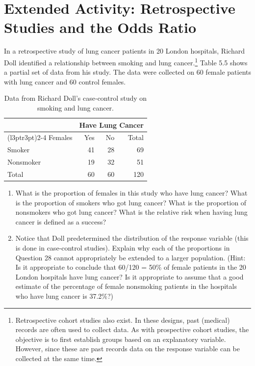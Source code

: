 \documentclass[
]{report}
\providecommand{\tightlist}{%
  \setlength{\itemsep}{0pt}\setlength{\parskip}{0pt}}
\begin{document}
\hypertarget{extended-activity-retrospective-studies-and-the-odds-ratio}{%
\section*{Extended Activity: Retrospective Studies and the Odds Ratio}\label{extended-activity-retrospective-studies-and-the-odds-ratio}}

In a retrospective study of lung cancer patients in 20 London hospitals, Richard Doll identified a relationship between smoking and lung cancer.\footnote{Retrospective cohort studies also exist. In these designs, past (medical) records are often used to collect data. As with prospective cohort studies, the objective is to first establish groups based on an explanatory variable. However, since these are past records data on the response variable can be collected at the same time.} Table 5.5 shows a partial set of data from his study. The data were collected on 60 female patients with lung cancer and 60 control females.

\begin{table}[!h]
\centering
\caption{\label{tab:tab5} Data from Richard Doll’s case‐control study on smoking and lung cancer.}
\centering
\begin{tabular}[t]{lrrr}
\toprule
\multicolumn{1}{c}{ } & \multicolumn{3}{c}{Have Lung Cancer} \\
\cmidrule(l{3pt}r{3pt}){2-4}
Females & Yes & No & Total\\
\midrule
Smoker & 41 & 28 & 69\\
Nonsmoker & 19 & 32 & 51\\
Total & 60 & 60 & 120\\
\bottomrule
\end{tabular}
\end{table}

\begin{enumerate}
\def\labelenumi{\arabic{enumi}.}
\setcounter{enumi}{27}
\tightlist
\item
  What is the proportion of females in this study who have lung cancer? What is the proportion of smokers who got lung cancer? What is the proportion of nonsmokers who got lung cancer? What is the relative risk when having lung cancer is defined as a success?\\
\item
  Notice that Doll predetermined the distribution of the response variable (this is done in case‑control studies). Explain why each of the proportions in Question 28 cannot appropriately be extended to a larger population. (Hint: Is it appropriate to conclude that 60/120 = 50\% of female patients in the 20 London hospitals have lung cancer? Is it appropriate to assume that a good estimate of the percentage of female nonsmoking patients in the hospitals who have lung cancer is 37.2\%?)
\end{enumerate}
\end{document}
